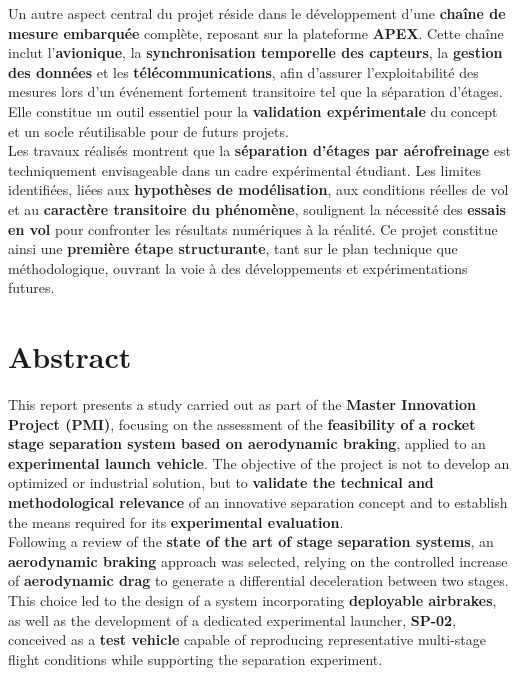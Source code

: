 Un autre aspect central du projet réside dans le développement d’une \textbf{chaîne de mesure embarquée} complète, reposant sur
la plateforme \textbf{APEX}. Cette chaîne inclut l’\textbf{avionique}, la \textbf{synchronisation temporelle des capteurs}, la
\textbf{gestion des données} et les \textbf{télécommunications}, afin d’assurer l’exploitabilité des mesures lors d’un événement
fortement transitoire tel que la séparation d’étages. Elle constitue un outil essentiel pour la \textbf{validation expérimentale}
du concept et un socle réutilisable pour de futurs projets.\\

Les travaux réalisés montrent que la \textbf{séparation d’étages par aérofreinage} est techniquement envisageable dans un cadre
expérimental étudiant. Les limites identifiées, liées aux \textbf{hypothèses de modélisation}, aux conditions réelles de vol et
au \textbf{caractère transitoire du phénomène}, soulignent la nécessité des \textbf{essais en vol} pour confronter les résultats
numériques à la réalité. Ce projet constitue ainsi une \textbf{première étape structurante}, tant sur le plan technique que
méthodologique, ouvrant la voie à des développements et expérimentations futures.

\newpage

\section*{Abstract}

This report presents a study carried out as part of the \textbf{Master Innovation Project (\acrshort{PMI})}, focusing on the
assessment of the \textbf{feasibility of a rocket stage separation system based on aerodynamic braking}, applied to an
\textbf{experimental launch vehicle}. The objective of the project is not to develop an optimized or industrial solution, but to
\textbf{validate the technical and methodological relevance} of an innovative separation concept and to establish the means
required for its \textbf{experimental evaluation}.\\

Following a review of the \textbf{state of the art of stage separation systems}, an \textbf{aerodynamic braking} approach was
selected, relying on the controlled increase of \textbf{aerodynamic drag} to generate a differential deceleration between two
stages. This choice led to the design of a system incorporating \textbf{deployable airbrakes}, as well as the development of a
dedicated experimental launcher, \textbf{SP-02}, conceived as a \textbf{test vehicle} capable of reproducing representative
multi-stage flight conditions while supporting the separation experiment.\\

